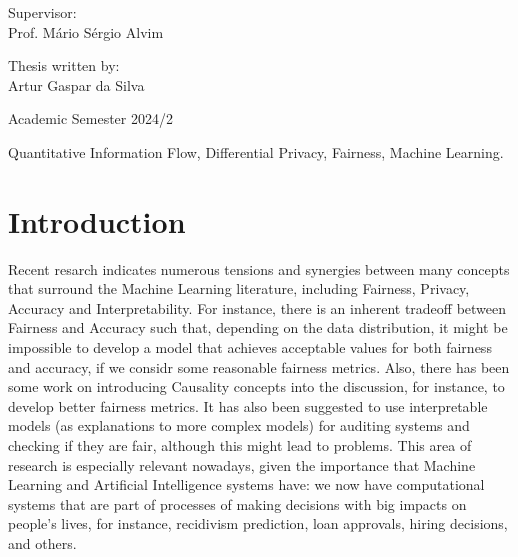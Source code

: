 \documentclass[conference]{IEEEtran}
\begin{document}
\begin{titlepage}
\begin{center}
        \vspace{0.5cm}


     \end{center}

\raggedright

\Large
    Supervisor:
    \vspace{0.2cm}\\
\Large
    Prof. Mário Sérgio Alvim
    \vspace{0.125cm}\\

\raggedleft

\Large
    Thesis written by:
    \vspace{0.125cm}\\
\Large
    Artur Gaspar da Silva



\begin{center}
    \vspace{1cm}
        Academic Semester 2024/2
\end{center}

\end{titlepage}


\newpage
\tableofcontents
\begin{IEEEkeywords}
    Quantitative Information Flow, Differential Privacy, Fairness, Machine Learning.
\end{IEEEkeywords}
\newpage
\twocolumn


\section{Introduction}
Recent resarch\cite{Sok}\cite{Reductions}\cite{Rachel}\cite{Awareness} indicates numerous tensions and synergies between many concepts that surround the Machine Learning literature, including Fairness, Privacy, Accuracy and Interpretability. For instance, there is an inherent tradeoff between Fairness and Accuracy such that, depending on the data distribution, it might be impossible to develop a model that achieves acceptable values for both fairness and accuracy, if we considr some reasonable fairness metrics\cite{Carlos}. Also, there has been some work on introducing Causality concepts into the discussion, for instance, to develop better fairness metrics\cite{CausalFair}. It has also been suggested to use interpretable models (as explanations to more complex models) for auditing systems and checking if they are fair, although this might lead to problems\cite{ExplainAll}. This area of research is especially relevant nowadays, given the importance that Machine Learning and Artificial Intelligence systems have: we now have computational systems that are part of processes of making decisions with big impacts on people's lives, for instance, recidivism prediction\cite{Compass}, loan approvals\cite{Loans}, hiring decisions\cite{Jobs}, and others.
\end{document}
